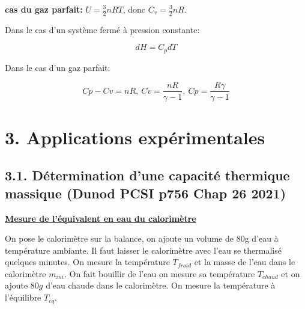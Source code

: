\documentclass[french, a4paper, 10pt, twocolumn, landscape]{article}
\begin{document}
\textbf{cas du gaz parfait:} $U = \frac{3}{2}nRT$, donc $C_v=\frac{3}{2}nR$.\medskip

Dans le cas d'un système fermé à pression constante:

\begin{equation}
    dH = C_p dT
\end{equation}

Dans le cas d'un gaz parfait: 

\begin{equation}
    Cp-Cv=nR,~Cv = \dfrac{nR}{\gamma -1},~Cp = \dfrac{R\gamma}{\gamma-1}
\end{equation}

\section*{3. Applications expérimentales}

\subsection*{3.1. Détermination d'une capacité thermique massique (Dunod PCSI p756  Chap 26 2021)}


\noindent\underline{\textbf{Mesure de l'équivalent en eau du calorimètre}}

On pose le calorimètre sur la balance, on ajoute un volume de 80g d'eau à température ambiante. Il faut laisser le calorimètre avec l'eau se thermalisé quelques minutes. On mesure la température $T_{froid}$ et la masse de l'eau dans le calorimètre $m_{ini}$. On fait bouillir de l'eau on mesure sa température $T_{chaud}$  et on ajoute $80g$ d'eau chaude dans le calorimètre.  On mesure la température à l'équilibre $T_{eq}$.
\end{document}
